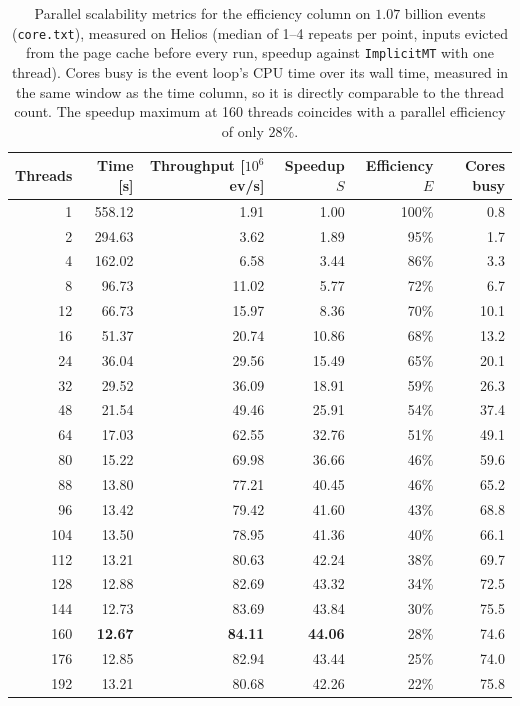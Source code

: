\begin{table}[htbp]
\centering
\caption{Parallel scalability metrics for the efficiency column on $1.07$ billion events (\texttt{core.txt}), measured on Helios (median of 1--4 repeats per point, inputs evicted from the page cache before every run, speedup against \texttt{ImplicitMT} with one thread). Cores busy is the event loop's CPU time over its wall time, measured in the same window as the time column, so it is directly comparable to the thread count. The speedup maximum at 160 threads coincides with a parallel efficiency of only $28\%$.}
\label{tab:scalability-efficiency}
\begin{tabular}{rrrrrr}
\toprule
Threads & Time [s] & Throughput [$10^6$ ev/s] & Speedup $S$ & Efficiency $E$ & Cores busy \\
\midrule
 1 & 558.12 & 1.91 & 1.00 & 100\% & 0.8 \\
 2 & 294.63 & 3.62 & 1.89 & 95\% & 1.7 \\
 4 & 162.02 & 6.58 & 3.44 & 86\% & 3.3 \\
 8 & 96.73 & 11.02 & 5.77 & 72\% & 6.7 \\
12 & 66.73 & 15.97 & 8.36 & 70\% & 10.1 \\
16 & 51.37 & 20.74 & 10.86 & 68\% & 13.2 \\
24 & 36.04 & 29.56 & 15.49 & 65\% & 20.1 \\
32 & 29.52 & 36.09 & 18.91 & 59\% & 26.3 \\
48 & 21.54 & 49.46 & 25.91 & 54\% & 37.4 \\
64 & 17.03 & 62.55 & 32.76 & 51\% & 49.1 \\
80 & 15.22 & 69.98 & 36.66 & 46\% & 59.6 \\
88 & 13.80 & 77.21 & 40.45 & 46\% & 65.2 \\
96 & 13.42 & 79.42 & 41.60 & 43\% & 68.8 \\
104 & 13.50 & 78.95 & 41.36 & 40\% & 66.1 \\
112 & 13.21 & 80.63 & 42.24 & 38\% & 69.7 \\
128 & 12.88 & 82.69 & 43.32 & 34\% & 72.5 \\
144 & 12.73 & 83.69 & 43.84 & 30\% & 75.5 \\
160 & \textbf{12.67} & \textbf{84.11} & \textbf{44.06} & 28\% & 74.6 \\
176 & 12.85 & 82.94 & 43.44 & 25\% & 74.0 \\
192 & 13.21 & 80.68 & 42.26 & 22\% & 75.8 \\
\bottomrule
\end{tabular}
\end{table}
